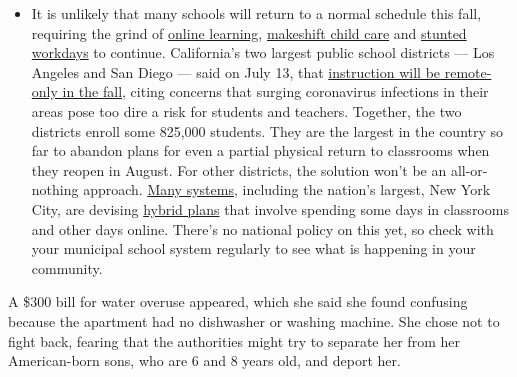 \begin{itemize}
  \begin{itemize}
  \tightlist
  \item
    It is unlikely that many schools will return to a normal schedule
    this fall, requiring the grind of
    \href{https://www.nytimes.com/2020/06/05/us/coronavirus-education-lost-learning.html?action=click\&pgtype=Article\&state=default\&region=MAIN_CONTENT_3\&context=storylines_faq}{online
    learning},
    \href{https://www.nytimes.com/2020/05/29/us/coronavirus-child-care-centers.html?action=click\&pgtype=Article\&state=default\&region=MAIN_CONTENT_3\&context=storylines_faq}{makeshift
    child care} and
    \href{https://www.nytimes.com/2020/06/03/business/economy/coronavirus-working-women.html?action=click\&pgtype=Article\&state=default\&region=MAIN_CONTENT_3\&context=storylines_faq}{stunted
    workdays} to continue. California's two largest public school
    districts --- Los Angeles and San Diego --- said on July 13, that
    \href{https://www.nytimes.com/2020/07/13/us/lausd-san-diego-school-reopening.html?action=click\&pgtype=Article\&state=default\&region=MAIN_CONTENT_3\&context=storylines_faq}{instruction
    will be remote-only in the fall}, citing concerns that surging
    coronavirus infections in their areas pose too dire a risk for
    students and teachers. Together, the two districts enroll some
    825,000 students. They are the largest in the country so far to
    abandon plans for even a partial physical return to classrooms when
    they reopen in August. For other districts, the solution won't be an
    all-or-nothing approach.
    \href{https://bioethics.jhu.edu/research-and-outreach/projects/eschool-initiative/school-policy-tracker/}{Many
    systems}, including the nation's largest, New York City, are
    devising
    \href{https://www.nytimes.com/2020/06/26/us/coronavirus-schools-reopen-fall.html?action=click\&pgtype=Article\&state=default\&region=MAIN_CONTENT_3\&context=storylines_faq}{hybrid
    plans} that involve spending some days in classrooms and other days
    online. There's no national policy on this yet, so check with your
    municipal school system regularly to see what is happening in your
    community.
  \end{itemize}
\end{itemize}

A \$300 bill for water overuse appeared, which she said she found
confusing because the apartment had no dishwasher or washing machine.
She chose not to fight back, fearing that the authorities might try to
separate her from her American-born sons, who are 6 and 8 years old, and
deport her.

